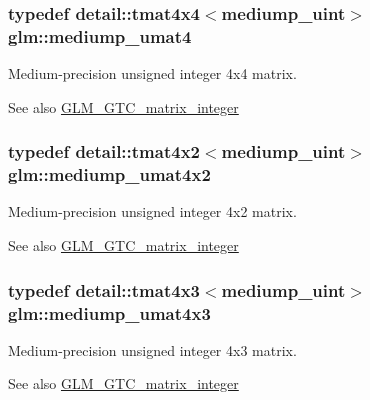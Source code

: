 \subsubsection[{mediump\+\_\+umat4}]{\setlength{\rightskip}{0pt plus 5cm}typedef detail\+::tmat4x4$<$mediump\+\_\+uint$>$ {\bf glm\+::mediump\+\_\+umat4}}\label{group__gtc__matrix__integer_ga41f8522ec6855007e5221193b58b156b}
Medium-\/precision unsigned integer 4x4 matrix. \begin{DoxySeeAlso}{See also}
\hyperlink{group__gtc__matrix__integer}{G\+L\+M\+\_\+\+G\+T\+C\+\_\+matrix\+\_\+integer} 
\end{DoxySeeAlso}
\hypertarget{group__gtc__matrix__integer_gaa1c11ec784503a43fbf8f52f5ed47ef1}{}
\subsubsection[{mediump\+\_\+umat4x2}]{\setlength{\rightskip}{0pt plus 5cm}typedef detail\+::tmat4x2$<$mediump\+\_\+uint$>$ {\bf glm\+::mediump\+\_\+umat4x2}}\label{group__gtc__matrix__integer_gaa1c11ec784503a43fbf8f52f5ed47ef1}
Medium-\/precision unsigned integer 4x2 matrix. \begin{DoxySeeAlso}{See also}
\hyperlink{group__gtc__matrix__integer}{G\+L\+M\+\_\+\+G\+T\+C\+\_\+matrix\+\_\+integer} 
\end{DoxySeeAlso}
\hypertarget{group__gtc__matrix__integer_gadf09c66253321ec625819792cacd5fc6}{}
\subsubsection[{mediump\+\_\+umat4x3}]{\setlength{\rightskip}{0pt plus 5cm}typedef detail\+::tmat4x3$<$mediump\+\_\+uint$>$ {\bf glm\+::mediump\+\_\+umat4x3}}\label{group__gtc__matrix__integer_gadf09c66253321ec625819792cacd5fc6}
Medium-\/precision unsigned integer 4x3 matrix. \begin{DoxySeeAlso}{See also}
\hyperlink{group__gtc__matrix__integer}{G\+L\+M\+\_\+\+G\+T\+C\+\_\+matrix\+\_\+integer} 
\end{DoxySeeAlso}
\hypertarget{group__gtc__matrix__integer_ga27a135717a6c01fc900a8f10862718ac}{}
